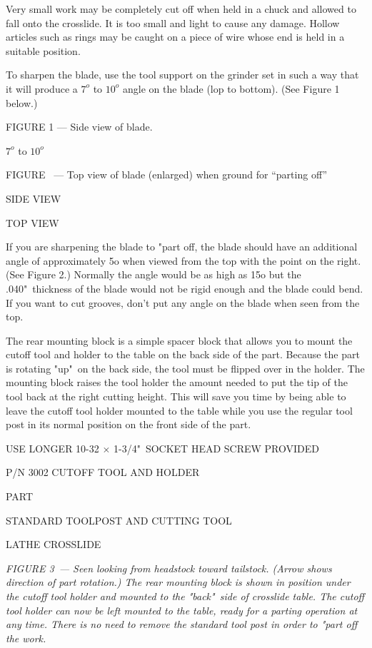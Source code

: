 Very small work may be completely cut off when held in a chuck and allowed to
fall onto the crosslide. It is too small and light to cause any damage. Hollow
articles such as rings may be caught on a piece of wire whose end is held in a
suitable position.


To sharpen the blade, use the tool support on the grinder set in such a way that
it will produce a $7^{o}$ to $10^{o}$ angle on the blade (lop to bottom). (See
Figure 1 below.)

\bigskip
FIGURE 1 --- Side view of blade.

$7^{o}$ to $10^{o}$

FIGURE \ --- Top view of blade (enlarged) when ground for ``parting off''

SIDE VIEW

TOP VIEW
\bigskip

If you are sharpening the blade to "part off, the blade should have an
additional angle of approximately 5o when viewed from the top with the point on
the right. (See Figure 2.) Normally the angle would be as high as 15o but the
.040"\ thickness of the blade would not be rigid enough and the blade could bend.
If you want to cut grooves, don't put any angle on the blade when seen from the
top.


The rear mounting block is a simple spacer block that allows you to mount the
cutoff tool and holder to the table on the back side of the part. Because the
part is rotating "up"\ on the back side, the tool must be flipped over in the
holder. The mounting block raises the tool holder the amount needed to put the
tip of the tool back at the right cutting height. This will save you time by
being able to leave the cutoff tool holder mounted to the table while you use
the regular tool post in its normal position on the front side of the part.

\bigskip
USE LONGER 10-32 $\times$ 1-3/4"\ SOCKET HEAD SCREW PROVIDED

P/N 3002 CUTOFF TOOL AND HOLDER

PART

STANDARD TOOLPOST AND CUTTING TOOL

LATHE CROSSLIDE
\bigskip

\textit{FIGURE 3\ --- Seen looking from headstock toward tailstock. (Arrow shows
direction of part rotation.) The rear mounting block is shown in position under
the cutoff tool holder and mounted to the "back"\ side of crosslide table. The
cutoff tool holder can now be left mounted to the table, ready for a parting
operation at any time. There is no need to remove the standard tool post in
order to "part off the work.}
\bigskip

